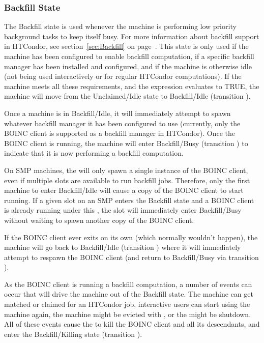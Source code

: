 \subsubsection{\label{sec:Backfill-State}Backfill State}

The Backfill state is used whenever the machine is performing low
priority background tasks to keep itself busy.
For more information about backfill support in HTCondor, see
section~\ref{sec:Backfill} on page~\pageref{sec:Backfill}.
This state is only used if the machine has been configured to enable
backfill computation, if a specific backfill manager has been
installed and configured, and if the machine is otherwise idle (not
being used interactively or for regular HTCondor computations).
If the machine meets all these requirements, and the
 expression evaluates to TRUE, the machine will
move from the Unclaimed/Idle state to Backfill/Idle (transition
).

Once a machine is in Backfill/Idle, it will immediately attempt to
spawn whatever backfill manager it has been configured to use
(currently, only the BOINC client is supported as a backfill manager
in HTCondor).
Once the BOINC client is running, the machine will enter
Backfill/Busy (transition ) to indicate that it is now
performing a backfill computation.

\Note On SMP machines, the  will only spawn a single
instance of the BOINC client, even if multiple slots are
available to run backfill jobs.
Therefore, only the first machine to enter Backfill/Idle will cause a
copy of the BOINC client to start running.
If a given slot on an SMP enters the Backfill state and a
BOINC client is already running under this , the
slot will immediately enter Backfill/Busy without waiting
to spawn another copy of the BOINC client.

If the BOINC client ever exits on its own (which normally wouldn't
happen), the machine will go back to Backfill/Idle (transition
) where it will immediately attempt to respawn the BOINC
client (and return to Backfill/Busy via transition ).

As the BOINC client is running a backfill computation, a number of
events can occur that will drive the machine out of the Backfill
state.
The machine can get matched or claimed for an HTCondor job, interactive
users can start using the machine again, the machine might be evicted
with , or the  might be shutdown.
All of these events cause the  to kill the BOINC client
and all its descendants, and enter the Backfill/Killing state
(transition ).

